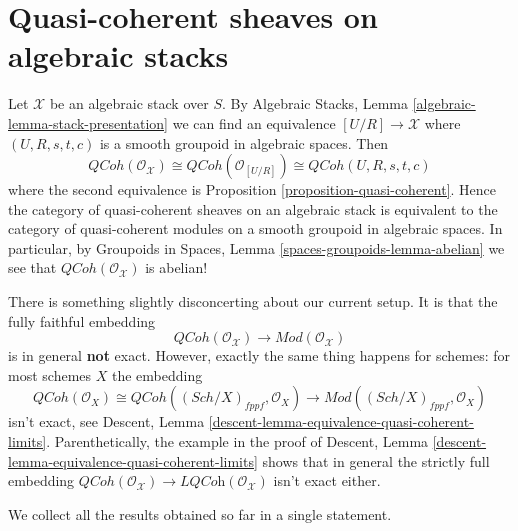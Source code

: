 \documentclass{stacks-project}
\theoremstyle{plain}
\theoremstyle{definition}
\theoremstyle{remark}
\numberwithin{equation}{subsection}
\def\Sch{\mathit{Sch}}
\def\QCoh{\mathit{QCoh}}
\begin{document}
\section{Quasi-coherent sheaves on algebraic stacks}
\label{section-quasi-coherent-algebraic-stacks}

\noindent
Let $\mathcal{X}$ be an algebraic stack over $S$. By
Algebraic Stacks, Lemma \ref{algebraic-lemma-stack-presentation}
we can find an equivalence $[U/R] \to \mathcal{X}$
where $(U, R, s, t, c)$ is a smooth groupoid in algebraic spaces.
Then
$$
\QCoh(\mathcal{O}_\mathcal{X})
\cong
\QCoh(\mathcal{O}_{[U/R]})
\cong
\QCoh(U, R, s, t, c)
$$
where the second equivalence is
Proposition \ref{proposition-quasi-coherent}.
Hence the category of quasi-coherent sheaves on an algebraic stack
is equivalent to the category of quasi-coherent modules on a smooth
groupoid in algebraic spaces. In particular, by
Groupoids in Spaces, Lemma \ref{spaces-groupoids-lemma-abelian}
we see that $\QCoh(\mathcal{O}_\mathcal{X})$ is abelian!

\medskip\noindent
There is something slightly disconcerting about our current setup.
It is that the fully faithful embedding
$$
\QCoh(\mathcal{O}_\mathcal{X})
\longrightarrow
\textit{Mod}(\mathcal{O}_\mathcal{X})
$$
is in general {\bf not} exact. However, exactly the same thing happens
for schemes: for most schemes $X$ the embedding
$$
\QCoh(\mathcal{O}_X) \cong
\QCoh((\Sch/X)_{fppf}, \mathcal{O}_X) \longrightarrow
\textit{Mod}((\Sch/X)_{fppf}, \mathcal{O}_X)
$$
isn't exact, see
Descent, Lemma \ref{descent-lemma-equivalence-quasi-coherent-limits}.
Parenthetically, the example in the proof of
Descent, Lemma \ref{descent-lemma-equivalence-quasi-coherent-limits}
shows that in general the strictly full embedding
$\QCoh(\mathcal{O}_\mathcal{X}) \to
\textit{LQCoh}(\mathcal{O}_\mathcal{X})$ isn't exact either.

\medskip\noindent
We collect all the results obtained so far in a single statement.
\end{document}
